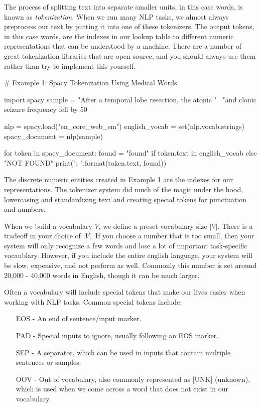 The process of splitting text into separate smaller units, in this case words, is known as \textit{tokenization}. When we run many NLP tasks, we almost always preprocess our text by putting it into one of these tokenizers. The output tokens,
in this case words, are the indexes in our lookup table to different numeric representations that can be understood by a machine. There are a number of great tokenization libraries that are open source, and you should always use them rather than
try to implement this yourself.

\begin{python}
  # Example 1: Spacy Tokenization Using Medical Words

  import spacy
  sample = "After a temporal lobe resection, the atonic " \
           "and clonic seizure frequency fell by 50%

  nlp = spacy.load("en_core_web_sm")
  english_vocab = set(nlp.vocab.strings)
  spacy_document = nlp(sample)

  for token in spacy_document:
      found = "found" if token.text in english_vocab else "NOT FOUND"
      print("{}: {}".format(token.text, found))
\end{python}

The discrete numeric entities created in Example 1 are the indexes for our representations. The tokenizer system did much of the magic under the hood, lowercasing and standardizing text and creating special tokens for punctuation and numbers.

When we build a vocabulary $V$, we define a preset vocabulary size $|V|$. There is a tradeoff in your choice of $|V|$. If you choose a number that is too small, then
your system will only recognize a few words and lose a lot of important task-specific vocaublary. However, if you include the entire english language, your system will be slow, expensive, and not perform as well.
Commonly this number is set around 20,000 - 40,000 words in English, though it can be much larger.

Often a vocabulary will include special tokens that make our lives easier when working with NLP tasks. Common special tokens include:
\begin{itemize}
  \item [EOS] - An end of sentence/input marker.
  \item [PAD] - Special inputs to ignore, usually following an EOS marker.
  \item [SEP] - A separator, which can be used in inputs that contain multiple sentences or samples.
  \item [OOV] - Out of vocabulary, also commonly represented as [UNK] (unknown), which is used when we come across a word that does not exist in our vocabulary.
\end{itemize}

